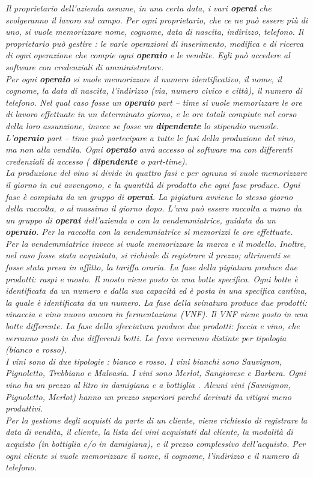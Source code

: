 \documentclass{article}
\begin{document}
\textit{
Il proprietario dell'azienda assume, in una certa data, i vari \textbf{operai} che svolgeranno il lavoro sul campo. Per ogni proprietario, che ce ne può essere più di uno, si vuole memorizzare nome, cognome, data di nascita, indirizzo, telefono.
Il proprietario può gestire : le varie operazioni di inserimento, modifica e di ricerca di ogni operazione che compie ogni \textbf{operaio} e le vendite. Egli può accedere al software con credenziali di amministratore.\\
Per ogni \textbf{operaio} si vuole memorizzare il numero identificativo, il nome, il cognome, la data di nascita, l'indirizzo (via, numero civico e città), il numero di telefono.
Nel qual caso fosse un \textbf{operaio} part – time si vuole memorizzare le ore di lavoro effettuate in un determinato giorno, e le ore totali compiute nel corso della loro assunzione, invece se fosse un \textbf{dipendente} lo stipendio mensile.
L'\textbf{operaio} part – time può partecipare a tutte le fasi della produzione del vino, ma non alla vendita.
Ogni \textbf{operaio} avrà accesso al software ma con differenti credenziali di accesso ( \textbf{dipendente} o part-time).\\\newline
La produzione del vino si divide in quattro fasi e per ognuna si vuole memorizzare il giorno in cui avvengono, e la quantità di prodotto che ogni fase produce. Ogni fase è compiuta da un gruppo di \textbf{operai}. La pigiatura avviene lo stesso giorno della raccolta, o al massimo il giorno dopo.
L’uva può essere raccolta a mano da un gruppo di \textbf{operai} dell'azienda o con la vendemmiatrice, guidata da un \textbf{operaio}.
Per la raccolta con la vendemmiatrice si memorizzi le ore effettuate.
Per la vendemmiatrice invece si vuole memorizzare la marca e il modello. Inoltre, nel caso fosse stata acquistata, si richiede di registrare il prezzo; altrimenti se fosse stata presa in affitto, la tariffa oraria.
La fase della pigiatura produce due prodotti: raspi e mosto. Il mosto viene posto in una botte specifica.
Ogni botte è identificata da un numero e dalla sua capacità ed è posta in una specifica cantina, la quale è identificata da un numero.
La fase della svinatura produce due prodotti: vinaccia e vino nuovo ancora in fermentazione (VNF). Il VNF viene posto in una botte differente. 
La fase della sfecciatura produce due prodotti: feccia e vino, che verranno posti in due differenti botti. Le fecce verranno distinte per tipologia (bianco e rosso).\\
I vini sono di due tipologie : bianco e rosso. I vini bianchi sono Sauvignon, Pignoletto, Trebbiano e Malvasia. I vini sono Merlot, Sangiovese e Barbera.
Ogni vino ha un prezzo al litro in damigiana e a bottiglia .
Alcuni vini (Sauvignon, Pignoletto, Merlot) hanno un prezzo superiori perché derivati da vitigni meno produttivi.\\\newline
Per la gestione degli acquisti da parte di un cliente, viene richiesto di registrare la data di vendita, il cliente, la lista dei vini acquistati dal cliente, la modalità di acquisto (in bottiglia e/o in damigiana), e il prezzo complessivo dell'acquisto. Per ogni cliente si vuole memorizzare il nome, il cognome, l'indirizzo e il numero di telefono.}\\
\end{document}
